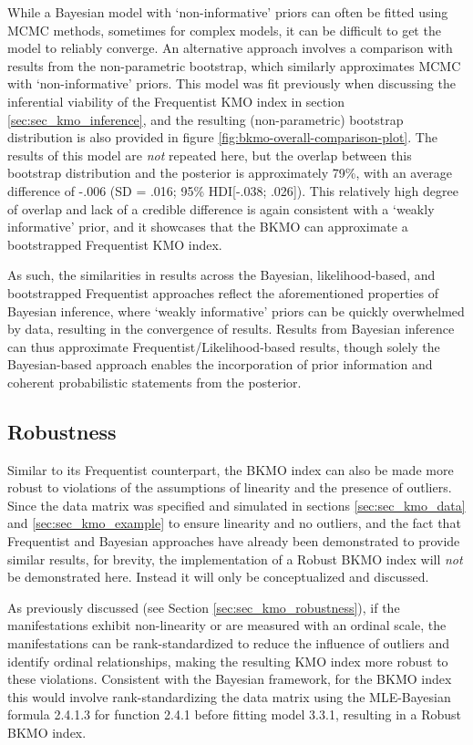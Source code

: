 \documentclass[
  10pt,
  a4paper,
  twoside]{article}
\begin{document}
While a Bayesian model with `non-informative' priors can often be fitted using MCMC methods, sometimes for complex models, it can be difficult to get the model to reliably converge. An alternative approach involves a comparison with results from the non-parametric bootstrap, which similarly approximates MCMC with `non-informative' priors. This model was fit previously when discussing the inferential viability of the Frequentist KMO index in section \ref{sec:sec_kmo_inference}, and the resulting (non-parametric) bootstrap distribution is also provided in figure \ref{fig:bkmo-overall-comparison-plot}. The results of this model are \emph{not} repeated here, but the overlap between this bootstrap distribution and the posterior is approximately 79\%, with an average difference of -.006 (SD = .016; 95\% HDI{[}-.038; .026{]}). This relatively high degree of overlap and lack of a credible difference is again consistent with a `weakly informative' prior, and it showcases that the BKMO can approximate a bootstrapped Frequentist KMO index.

As such, the similarities in results across the Bayesian, likelihood-based, and bootstrapped Frequentist approaches reflect the aforementioned properties of Bayesian inference, where `weakly informative' priors can be quickly overwhelmed by data, resulting in the convergence of results. Results from Bayesian inference can thus approximate Frequentist/Likelihood-based results, though solely the Bayesian-based approach enables the incorporation of prior information and coherent probabilistic statements from the posterior.

\subsection{Robustness}\label{sec:sec_bkmo_robustness}

Similar to its Frequentist counterpart, the BKMO index can also be made more robust to violations of the assumptions of linearity and the presence of outliers. Since the data matrix was specified and simulated in sections \ref{sec:sec_kmo_data} and \ref{sec:sec_kmo_example} to ensure linearity and no outliers, and the fact that Frequentist and Bayesian approaches have already been demonstrated to provide similar results, for brevity, the implementation of a Robust BKMO index will \emph{not} be demonstrated here. Instead it will only be conceptualized and discussed.

As previously discussed (see Section \ref{sec:sec_kmo_robustness}), if the manifestations exhibit non-linearity or are measured with an ordinal scale, the manifestations can be rank-standardized to reduce the influence of outliers and identify ordinal relationships, making the resulting KMO index more robust to these violations. Consistent with the Bayesian framework, for the BKMO index this would involve rank-standardizing the data matrix using the MLE-Bayesian formula 2.4.1.3 for function 2.4.1 before fitting model 3.3.1, resulting in a Robust BKMO index.
\end{document}
